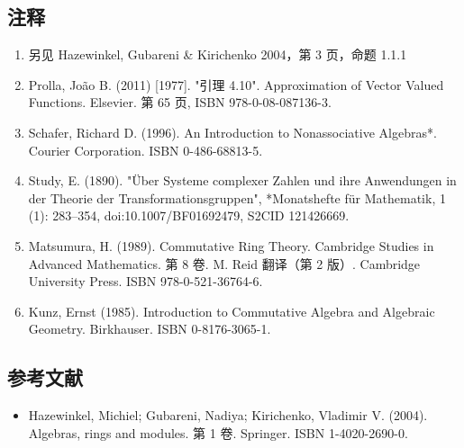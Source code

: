 \subsection{注释}
\begin{enumerate}
\item 另见 Hazewinkel, Gubareni & Kirichenko 2004，第 3 页，命题 1.1.1
\item Prolla, João B. (2011) [1977]. "引理 4.10". Approximation of Vector Valued Functions. Elsevier. 第 65 页, ISBN 978-0-08-087136-3.
\item Schafer, Richard D. (1996). An Introduction to Nonassociative Algebras*. Courier Corporation. ISBN 0-486-68813-5.
\item Study, E. (1890). "Über Systeme complexer Zahlen und ihre Anwendungen in der Theorie der Transformationsgruppen", *Monatshefte für Mathematik, 1 (1): 283–354, doi:10.1007/BF01692479, S2CID 121426669.
\item Matsumura, H. (1989). Commutative Ring Theory. Cambridge Studies in Advanced Mathematics. 第 8 卷. M. Reid 翻译（第 2 版）. Cambridge University Press. ISBN 978-0-521-36764-6. 
\item Kunz, Ernst (1985). Introduction to Commutative Algebra and Algebraic Geometry. Birkhauser. ISBN 0-8176-3065-1.
\end{enumerate}
\subsection{参考文献}
\begin{itemize}
\item Hazewinkel, Michiel; Gubareni, Nadiya; Kirichenko, Vladimir V. (2004). Algebras, rings and modules. 第 1 卷. Springer. ISBN 1-4020-2690-0.
\end{itemize}